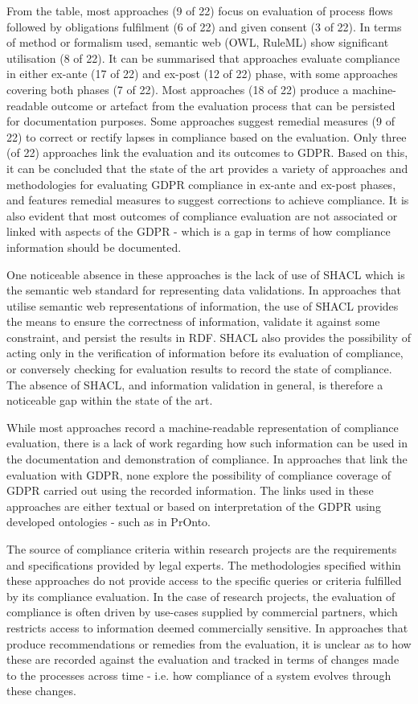 From the table, most approaches (9 of 22) focus on evaluation of process flows followed by obligations fulfilment (6 of 22) and given consent (3 of 22). In terms of method or formalism used, semantic web (OWL, RuleML) show significant utilisation (8 of 22). It can be summarised that approaches evaluate compliance in either ex-ante (17 of 22) and ex-post (12 of 22) phase, with some approaches covering both phases (7 of 22).
Most approaches (18 of 22) produce a machine-readable outcome or artefact from the evaluation process that can be persisted for documentation purposes. Some approaches suggest remedial measures (9 of 22) to correct or rectify lapses in compliance based on the evaluation. Only three (of 22) approaches link the evaluation and its outcomes to GDPR. Based on this, it can be concluded that the state of the art provides a variety of approaches and methodologies for evaluating GDPR compliance in ex-ante and ex-post phases, and features remedial measures to suggest corrections to achieve compliance. It is also evident that most outcomes of compliance evaluation are not associated or linked with aspects of the GDPR - which is a gap in terms of how compliance information should be documented.

One noticeable absence in these approaches is the lack of use of SHACL which is the semantic web standard for representing data validations. In approaches that utilise semantic web representations of information, the use of SHACL provides the means to ensure the correctness of information, validate it against some constraint, and persist the results in RDF. SHACL also provides the possibility of acting only in the verification of information before its evaluation of compliance, or conversely checking for evaluation results to record the state of compliance.
The absence of SHACL, and information validation in general, is therefore a noticeable gap within the state of the art.

While most approaches record a machine-readable representation of compliance evaluation, there is a lack of work regarding how such information can be used in the documentation and demonstration of compliance. In approaches that link the evaluation with GDPR, none explore the possibility of compliance coverage of GDPR carried out using the recorded information. The links used in these approaches are either textual or based on interpretation of the GDPR using developed ontologies - such as in PrOnto.

The source of compliance criteria within research projects are the requirements and specifications provided by legal experts. The methodologies specified within these approaches do not provide access to the specific queries or criteria fulfilled by its compliance evaluation.
In the case of research projects, the evaluation of compliance is often driven by use-cases supplied by commercial partners, which restricts access to information deemed commercially sensitive.
In approaches that produce recommendations or remedies from the evaluation, it is unclear as to how these are recorded against the evaluation and tracked in terms of changes made to the processes across time - i.e. how compliance of a system evolves through these changes. 

